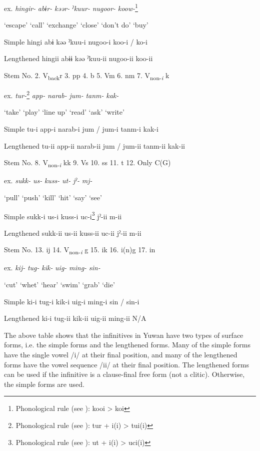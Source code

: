 ex.  \textit{hingir-}  \textit{abɨr-}  \textit{kəər-}  \textit{ˀkuur-}  \textit{nugoor-}  \textit{koow-}\footnote{Phonological rule (see ): kooi > koi}

  ‘escape’  ‘call’  ‘exchange’  ‘close’  ‘don’t do’  ‘buy’

Simple  hingi  abɨ  kəə  ˀkuu-i  nugoo-i  koo-i / ko-i

Lengthened  hingii  abɨɨ  kəə  ˀkuu-ii  nugoo-ii  koo-ii

Stem No.  2. V\textsubscript{back}r  3. pp  4. b  5. Vm  6. nm  7. V\textsubscript{non-}\textit{\textsubscript{i} }k

ex.  \textit{tur-}\footnote{Phonological rule (see ): tur + i(i) > tui(i)}  \textit{app-}  \textit{narab-}  \textit{jum-}  \textit{tanm-}  \textit{kak-}

  ‘take’  ‘play’  ‘line up’  ‘read’  ‘ask’  ‘write’

Simple  tu-i  app-i  narab-i  jum / jum-i  tanm-i  kak-i

Lengthened  tu-ii  app-ii  narab-ii  jum / jum-ii  tanm-ii  kak-ii

Stem No.  8. V\textsubscript{non-}\textit{\textsubscript{i} }kk  9. Vs  10. ss  11. t  12. Only C(G)

ex.  \textit{sukk-}  \textit{us-}  \textit{kuss-}  \textit{ut-}  \textit{jˀ-}  \textit{mj-}

  ‘pull’  ‘push’  ‘kill’  ‘hit’  ‘say’  ‘see’

Simple  sukk-i  us-i  kuss-i  uc-i\footnote{Phonological rule (see ): ut + i(i) > uci(i)}  jˀ-ii  m-ii

Lengthened  sukk-ii  us-ii  kuss-ii  uc-ii  jˀ-ii  m-ii

Stem No.  13. ij  14. V\textsubscript{non-}\textit{\textsubscript{i}} g  15. ik  16. i(n)g    17. in

ex.  \textit{kij-}  \textit{tug-}  \textit{kik-}  \textit{uig-}  \textit{ming-}  \textit{sin-}

  ‘cut’  ‘whet’  ‘hear’  ‘swim’  ‘grab’  ‘die’

Simple  ki-i  tug-i  kik-i  uig-i  ming-i  sin / sin-i

Lengthened  ki-i  tug-ii  kik-ii  uig-ii  ming-ii  N/A

The above table shows that the infinitives in Yuwan have two types of surface forms, i.e. the simple forms and the lengthened forms. Many of the simple forms have the single vowel /i/ at their final position, and many of the lengthened forms have the vowel sequence /ii/ at their final position. The lengthened forms can be used if the infinitive is a clause-final free form (not a clitic). Otherwise, the simple forms are used.

